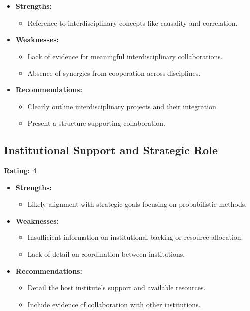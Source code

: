 \documentclass{article}
\begin{document}
\begin{itemize}
    \item \textbf{Strengths:}
    \begin{itemize}
        \item Reference to interdisciplinary concepts like causality and correlation.
    \end{itemize}
    \item \textbf{Weaknesses:}
    \begin{itemize}
        \item Lack of evidence for meaningful interdisciplinary collaborations.
        \item Absence of synergies from cooperation across disciplines.
    \end{itemize}
    \item \textbf{Recommendations:}
    \begin{itemize}
        \item Clearly outline interdisciplinary projects and their integration.
        \item Present a structure supporting collaboration.
    \end{itemize}
\end{itemize}

\subsection{Institutional Support and Strategic Role}

\textbf{Rating: 4}

\begin{itemize}
    \item \textbf{Strengths:}
    \begin{itemize}
        \item Likely alignment with strategic goals focusing on probabilistic methods.
    \end{itemize}
    \item \textbf{Weaknesses:}
    \begin{itemize}
        \item Insufficient information on institutional backing or resource allocation.
        \item Lack of detail on coordination between institutions.
    \end{itemize}
    \item \textbf{Recommendations:}
    \begin{itemize}
        \item Detail the host institute's support and available resources.
        \item Include evidence of collaboration with other institutions.
    \end{itemize}
\end{itemize}
\end{document}
